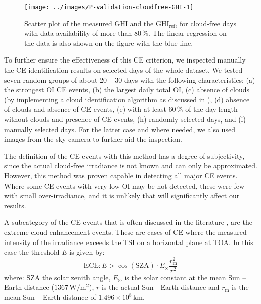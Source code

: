 \documentclass[preprint, 5p,
authoryear]{elsarticle} %
\begin{document}
\begin{figure}[H]

{\centering \texttt{[image: ../images/P-validation-cloudfree-GHI-1]} 

}

\caption{Scatter plot of the measured GHI and the $\text{GHI}_\text{ref}$, for cloud-free days with data availability of more than $80\,\%$. The linear regression on the data is also shown on the figure with the blue line.}\label{fig:validation-GHI}
\end{figure}

To further ensure the effectiveness of this CE criterion, we inspected
manually the CE identification results on selected days of the whole
dataset. We tested seven random groups of about 20 -- 30 days with the
following characteristics: (a) the strongest OI CE events, (b) the
largest daily total OI, (c) absence of clouds (by implementing a cloud
identification algorithm as discussed in \citet{Natsis2023}), (d)
absence of clouds and absence of CE events, (e) with at least \(60\,\%\)
of the day length without clouds and presence of CE events, (h) randomly
selected days, and (i) manually selected days. For the latter case and
where needed, we also used images from the sky-camera to further aid the
inspection.

The definition of the CE events with this method has a degree of
subjectivity, since the actual cloud-free irradiance is not known and
can only be approximated. However, this method was proven capable in
detecting all major CE events. Where some CE events with very low OI may
be not detected, these were few with small over-irradiance, and it is
unlikely that will significantly affect our results.

A subcategory of the CE events that is often discussed in the literature
\citep{Cordero2023, Martins2022, Yordanov2015}, are the extreme cloud
enhancement events. These are cases of CE where the measured intensity
of the irradiance exceeds the TSI on a horizontal plane at TOA. In this
case the threshold \(E\) is given by: \begin{equation}
\text{ECE}: E > \cos(\text{SZA}) \cdot E_{\odot} \frac{r^2_\text{m}}{r^2}
\label{eq:ECE}
\end{equation} where: \(\text{SZA}\) the solar zenith angle,
\(E_{\odot}\) is the solar constant at the mean Sun -- Earth distance
(\(1367\,\text{W}/\text{m}^2\)), \(r\) is the actual Sun - Earth
distance and \(r_\text{m}\) is the mean Sun -- Earth distance of
\(1.496\times10^8\,\text{km}\).
\end{document}

